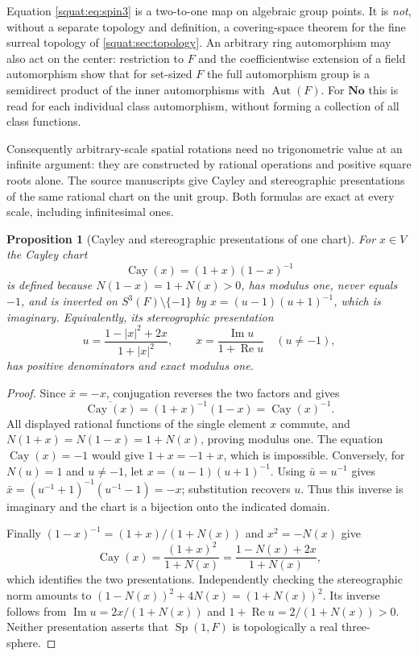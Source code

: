 \documentclass[11pt,letterpaper]{article}
\numberwithin{equation}{section}
\newtheorem{proposition}[proposition]{Proposition}
\theoremstyle{definition}
\theoremstyle{remark}
\newcommand{\No}{\mathbf{No}}
\newcommand{\Rea}{\operatorname{Re}}
\newcommand{\Ima}{\operatorname{Im}}
\newcommand{\Aut}{\operatorname{Aut}}
\newcommand{\Sp}{\operatorname{Sp}}
\newcommand{\abs}[1]{\left|#1\right|}
\begin{document}
Equation \cref{squat:eq:spin3} is a two-to-one map on algebraic group points. It is
\emph{not}, without a separate topology and definition, a covering-space theorem for the
fine surreal topology of \cref{squat:sec:topology}. An arbitrary ring automorphism may
also act on the center: restriction to $F$ and the coefficientwise extension of a field
automorphism show that for set-sized $F$ the full automorphism group is a semidirect
product of the inner automorphisms with $\Aut(F)$. For $\No$ this is read for each
individual class automorphism, without forming a collection of all class functions.

Consequently arbitrary-scale spatial rotations need no trigonometric value at an infinite
argument: they are constructed by rational operations and positive square roots alone.
The source manuscripts give Cayley and stereographic presentations of the same rational
chart on the unit group. Both formulas are exact at every scale, including infinitesimal
ones.

\begin{proposition}[Cayley and stereographic presentations of one chart]\label{squat:prop:charts}
For $x\in V$ the \emph{Cayley chart}
\begin{equation}\label{squat:eq:cayley}
 \operatorname{Cay}(x)=(1+x)(1-x)^{-1}
\end{equation}
is defined because $N(1-x)=1+N(x)>0$, has modulus one, never equals $-1$, and is
inverted on $S^3(F)\setminus\{-1\}$ by $x=(u-1)(u+1)^{-1}$, which is imaginary.
Equivalently, its \emph{stereographic presentation}
\begin{equation}\label{squat:eq:stereographic}
 u=\frac{1-\abs x^2+2x}{1+\abs x^2},\qquad
 x=\frac{\Ima u}{1+\Rea u}\quad(u\ne-1),
\end{equation}
has positive denominators and exact modulus one.
\end{proposition}
\begin{proof}
Since $\bar x=-x$, conjugation reverses the two factors and gives
\[
 \overline{\operatorname{Cay}(x)}=(1+x)^{-1}(1-x)
 =\operatorname{Cay}(x)^{-1}.
\]
All displayed rational functions of the single element $x$ commute, and
$N(1+x)=N(1-x)=1+N(x)$, proving modulus one. The equation
$\operatorname{Cay}(x)=-1$ would give $1+x=-1+x$, which is impossible.
Conversely, for $N(u)=1$ and $u\ne-1$, let $x=(u-1)(u+1)^{-1}$.
Using $\bar u=u^{-1}$ gives
$\bar x=(u^{-1}+1)^{-1}(u^{-1}-1)=-x$; substitution recovers $u$.
Thus this inverse is imaginary and the chart is a bijection onto the indicated domain.

Finally $(1-x)^{-1}=(1+x)/(1+N(x))$ and $x^2=-N(x)$ give
\[
 \operatorname{Cay}(x)=\frac{(1+x)^2}{1+N(x)}
 =\frac{1-N(x)+2x}{1+N(x)},
\]
which identifies the two presentations. Independently checking the stereographic norm
amounts to $(1-N(x))^2+4N(x)=(1+N(x))^2$. Its inverse follows from
$\operatorname{Im}u=2x/(1+N(x))$ and $1+\operatorname{Re}u=2/(1+N(x))>0$.
Neither presentation asserts that $\Sp(1,F)$ is topologically a real three-sphere.
\end{proof}
\end{document}
